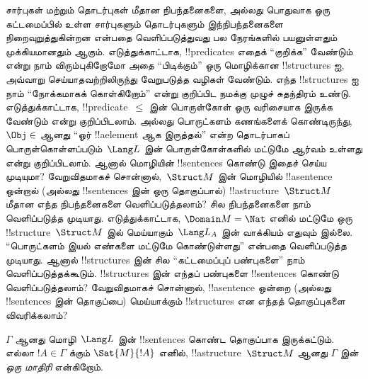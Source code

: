 \documentclass[../../../include/open-logic-section]{subfiles}
\begin{document}



\begin{explain}
சார்புகள் மற்றும் தொடர்புகள் மீதான நிபந்தனைகளை, அல்லது பொதுவாக ஒரு
கட்டமைப்பில் உள்ள சார்புகளும் தொடர்புகளும் இந்நிபந்தனைகளை
நிறைவுறுத்துகின்றன என்பதை வெளிப்படுத்துவது பல நேரங்களில் பயனுள்ளதும்
முக்கியமானதும் ஆகும். எடுத்துக்காட்டாக, !!{predicate}s எதைக்
``குறிக்க'' வேண்டும் என்று நாம் விரும்புகிறோமோ அதை ``பிடிக்கும்'' ஒரு
மொழிக்கான !!{structure}s ஐ, அவ்வாறு செய்யாதவற்றிலிருந்து வேறுபடுத்த
வழிகள் வேண்டும். எந்த !!{structure}s ஐ நாம் ``நோக்கமாகக் கொள்கிறோம்''
என்று குறிப்பிட நமக்கு முழுச் சுதந்திரம் உண்டு. எடுத்துக்காட்டாக,
!!{predicate}~$\le$ இன் பொருள்கோள் ஒரு வரிசையாக இருக்க வேண்டும் என்று
குறிப்பிடலாம். அல்லது பொருட்களம் கணங்களைக் கொண்டிருந்து, $\Obj \in$
ஆனது ``ஓர் !!a{element} ஆக இருத்தல்'' என்ற தொடர்பாகப்
பொருள்கொள்ளப்படும்~$\Lang L$ இன் பொருள்கோள்களில் மட்டுமே ஆர்வம் உள்ளது
என்று குறிப்பிடலாம். ஆனால் மொழியின் !!{sentence}s கொண்டு இதைச் செய்ய
முடியுமா? வேறுவிதமாகச் சொன்னால்,~$\Struct M$ இன் மொழியில்
!!a{sentence} ஒன்றால் (அல்லது !!{sentence}s இன் ஒரு தொகுப்பால்)
!!a{structure}~$\Struct M$ மீதான எந்த நிபந்தனைகளை வெளிப்படுத்தலாம்?
சில நிபந்தனைகளை நாம் வெளிப்படுத்த முடியாது. எடுத்துக்காட்டாக,
$\Domain M = \Nat$ எனில் மட்டுமே ஒரு !!{structure}~$\Struct M$ இல்
மெய்யாகும்~$\Lang L_A$ இன் வாக்கியம் எதுவும் இல்லை.
``பொருட்களம் இயல் எண்களை மட்டுமே கொண்டுள்ளது'' என்பதை வெளிப்படுத்த
முடியாது. ஆனால் !!{structure}s இன் சில ``கட்டமைப்புப் பண்புகளை''
நாம் வெளிப்படுத்தக்கூடும். !!{structure}s இன் எந்தப் பண்புகளை
!!{sentence}s கொண்டு வெளிப்படுத்தலாம்? வேறுவிதமாகச் சொன்னால்,
!!a{sentence} ஒன்றை (அல்லது !!{sentence}s இன் தொகுப்பை) மெய்யாக்கும்
!!{structure}s என எந்தத் தொகுப்புகளை விவரிக்கலாம்?
\end{explain}

\begin{defn}[ஒரு தொகுப்பின் மாதிரி]
$\Gamma$ ஆனது மொழி~$\Lang L$ இன் !!{sentence}s கொண்ட தொகுப்பாக
இருக்கட்டும். எல்லா $!A \in \Gamma$ க்கும் $\Sat{M}{!A}$ எனில்,
!!a{structure}~$\Struct M$ ஆனது $\Gamma$ இன்
\emph{ஒரு மாதிரி} என்கிறோம்.
\end{defn}
\end{document}
